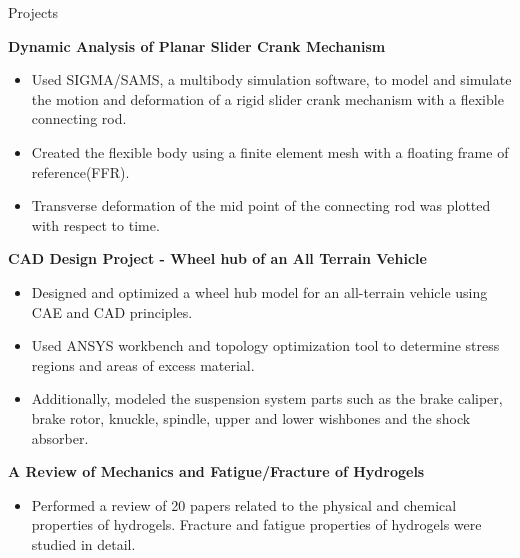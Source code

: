 \documentclass{resume}
\begin{document}
\begin{rSection}{Projects}

{\bf Dynamic Analysis of Planar Slider Crank Mechanism}
\vspace{-0.70em}
\begin{itemize}
 \setlength\itemsep{-0.65em}
    \item Used SIGMA/SAMS, a multibody simulation software, to model and simulate the motion and deformation of a rigid slider crank mechanism with a flexible connecting rod.
    \item Created the flexible body using a finite element mesh with a floating frame of reference(FFR).
    \item Transverse deformation of the mid point of the connecting rod was plotted with respect to time.
\end{itemize}

{\bf CAD Design Project - Wheel hub of an All Terrain Vehicle}
\vspace{-0.70em}
\begin{itemize}
 \setlength\itemsep{-0.65em}
    \item Designed and optimized a wheel hub model for an all-terrain vehicle using CAE and CAD principles.
    \item Used ANSYS workbench and topology optimization tool to determine stress regions and areas of excess material.
    \item Additionally, modeled the suspension system parts such as the brake caliper, brake rotor, knuckle, spindle, upper and lower wishbones and the shock absorber.
\end{itemize}

{\bf A Review of Mechanics and Fatigue/Fracture of Hydrogels}
\vspace{-0.70em}
\begin{itemize}
 \setlength\itemsep{-0.65em}
    \item Performed a review of 20 papers related to the physical and chemical properties of hydrogels. Fracture and fatigue properties of hydrogels were studied in detail.
\end{itemize}


\end{rSection}
\end{document}
